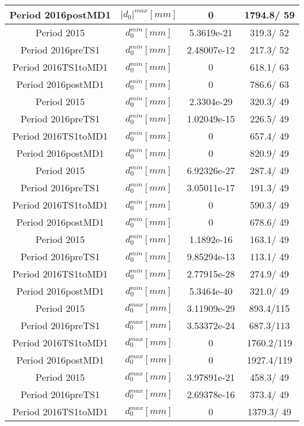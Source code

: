 \documentclass{article}
\begin{document}
\begin{longtable}{c|c|c|c}
\hline
 Period 2016postMD1 & $|d_{0}|^{max} [mm]$ & 0 & 1794.8/ 59\\
\hline
 Period 2015 & $d_{0}^{min} [mm]$ & 5.3619e-21 & 319.3/ 52\\
\hline
 Period 2016preTS1 & $d_{0}^{min} [mm]$ & 2.48007e-12 & 217.3/ 52\\
\hline
 Period 2016TS1toMD1 & $d_{0}^{min} [mm]$ & 0 & 618.1/ 63\\
\hline
 Period 2016postMD1 & $d_{0}^{min} [mm]$ & 0 & 786.6/ 63\\
\hline
 Period 2015 & $d_{0}^{min} [mm]$ & 2.3304e-29 & 320.3/ 49\\
\hline
 Period 2016preTS1 & $d_{0}^{min} [mm]$ & 1.02049e-15 & 226.5/ 49\\
\hline
 Period 2016TS1toMD1 & $d_{0}^{min} [mm]$ & 0 & 657.4/ 49\\
\hline
 Period 2016postMD1 & $d_{0}^{min} [mm]$ & 0 & 820.9/ 49\\
\hline
 Period 2015 & $d_{0}^{min} [mm]$ & 6.92326e-27 & 287.4/ 49\\
\hline
 Period 2016preTS1 & $d_{0}^{min} [mm]$ & 3.05011e-17 & 191.3/ 49\\
\hline
 Period 2016TS1toMD1 & $d_{0}^{min} [mm]$ & 0 & 590.3/ 49\\
\hline
 Period 2016postMD1 & $d_{0}^{min} [mm]$ & 0 & 678.6/ 49\\
\hline
 Period 2015 & $d_{0}^{min} [mm]$ & 1.1892e-16 & 163.1/ 49\\
\hline
 Period 2016preTS1 & $d_{0}^{min} [mm]$ & 9.85294e-13 & 113.1/ 49\\
\hline
 Period 2016TS1toMD1 & $d_{0}^{min} [mm]$ & 2.77915e-28 & 274.9/ 49\\
\hline
 Period 2016postMD1 & $d_{0}^{min} [mm]$ & 5.3464e-40 & 321.0/ 49\\
\hline
 Period 2015 & $d_{0}^{max} [mm]$ & 3.11909e-29 & 893.4/115\\
\hline
 Period 2016preTS1 & $d_{0}^{max} [mm]$ & 3.53372e-24 & 687.3/113\\
\hline
 Period 2016TS1toMD1 & $d_{0}^{max} [mm]$ & 0 & 1760.2/119\\
\hline
 Period 2016postMD1 & $d_{0}^{max} [mm]$ & 0 & 1927.4/119\\
\hline
 Period 2015 & $d_{0}^{max} [mm]$ & 3.97891e-21 & 458.3/ 49\\
\hline
 Period 2016preTS1 & $d_{0}^{max} [mm]$ & 2.69378e-16 & 373.4/ 49\\
\hline
 Period 2016TS1toMD1 & $d_{0}^{max} [mm]$ & 0 & 1379.3/ 49\\

\end{longtable}
\end{document}
